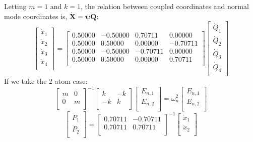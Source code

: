 Letting $m=1$ and $k=1$, the relation between coupled coordinates and normal mode coordinates is, $\pmb{\dot{X}}=\pmb{\psi}\pmb{\dot{Q}}$:
\[
\begin{bmatrix}
   \dot{x}_1\\
   \dot{x}_2\\
   \dot{x}_3\\
   \dot{x}_4\\
\end{bmatrix}=
\begin{bmatrix}
  0.50000 & -0.50000  & 0.70711 & 0.00000 \\
  0.50000 &  0.50000 &  0.00000 & -0.70711 \\ 
  0.50000 & -0.50000 & -0.70711 & 0.00000  \\
  0.50000 &  0.50000 &  0.00000 & 0.70711  \\
\end{bmatrix}
\begin{bmatrix}
   \dot{Q}_1\\
   \dot{Q}_2\\
   \dot{Q}_3\\
   \dot{Q}_4\\
\end{bmatrix}
\]
If we take the 2 atom case:
\[
\begin{bmatrix}
   m & 0  \\
   0 & m  \\
\end{bmatrix}^{-1}
\begin{bmatrix}
    k & -k  \\
   -k & k  \\
\end{bmatrix}
\begin{bmatrix}
   E_{n,1} \\
   E_{n,2} \\
\end{bmatrix}
=\omega^2_n
\begin{bmatrix}
   E_{n,1} \\
   E_{n,2} \\
\end{bmatrix}
\]
\[
\begin{bmatrix}
   \dot{P}_1\\
   \dot{P}_2\\
\end{bmatrix}=
\begin{bmatrix}
  0.70711 &  -0.70711 \\
  0.70711 &  0.70711 \\
\end{bmatrix}^{-1}
\begin{bmatrix}
   \dot{x}_1\\
   \dot{x}_2\\
\end{bmatrix}
\]

